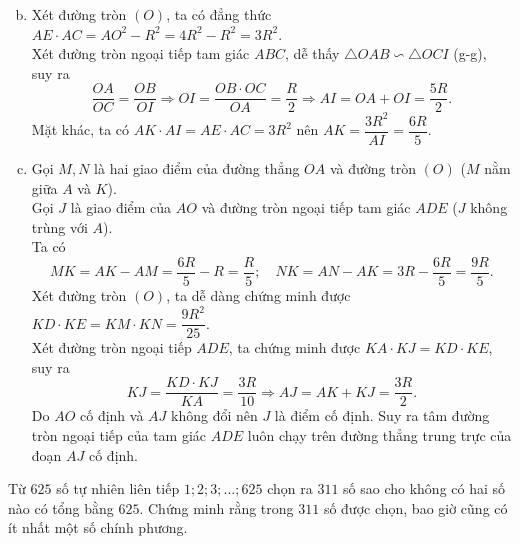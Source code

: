 \begin{ex}
{{\begin{tikzpicture}[>=stealth]
	\end{tikzpicture}
}
	\begin{enumerate}[a)]
	\setcounter{enumi}{1}
	\item Xét đường tròn $(O)$, ta có đẳng thức $AE \cdot AC = AO^2 - R^2 = 4R^2 - R^2 = 3R^2$.	\\
	Xét đường tròn ngoại tiếp tam giác $ABC$, dễ thấy $\triangle OAB \backsim \triangle OCI$ (g-g), suy ra $$\dfrac{OA}{OC} = \dfrac{OB}{OI} \Rightarrow OI = \dfrac{OB \cdot OC}{OA} = \dfrac{R}{2} \Rightarrow AI = OA + OI = \dfrac{5R}{2}.$$
	Mặt khác, ta có $AK \cdot AI = AE \cdot AC = 3R^2$ nên $AK = \dfrac{3R^2}{AI} = \dfrac{6R}{5}$.
	\item Gọi $M,N$ là hai giao điểm của đường thẳng $OA$ và đường tròn $(O)$ ($M$ nằm giữa $A$ và $K$).\\
	Gọi $J$ là giao điểm của $AO$ và đường tròn ngoại tiếp tam giác $ADE$ ($J$ không trùng với $A$).\\
	Ta có 
	$$MK = AK - AM = \dfrac{6R}{5} - R = \dfrac{R}{5}; \quad NK = AN - AK = 3R - \dfrac{6R}{5} = \dfrac{9R}{5}.$$
	Xét đường tròn $(O)$, ta dễ dàng chứng minh được $KD \cdot KE = KM \cdot KN = \dfrac{9R^2}{25}$.\\
	Xét đường tròn ngoại tiếp $ADE$, ta chứng minh được $KA \cdot KJ = KD \cdot KE$, suy ra $$KJ = \dfrac{KD \cdot KJ}{KA} = \dfrac{3R}{10} \Rightarrow AJ = AK + KJ = \dfrac{3R}{2}.$$
	Do $AO$ cố định và $AJ$ không đổi nên $J$ là điểm cố định. Suy ra tâm đường tròn ngoại tiếp của tam giác $ADE$ luôn chạy trên đường thẳng trung trực của đoạn $AJ$ cố định.
	\end{enumerate}
}
\end{ex}

\begin{ex}%
Từ $625$ số tự nhiên liên tiếp $1;2;3;\dots;625$ chọn ra $311$ số sao cho không có hai số nào có tổng bằng $625$. Chứng minh rằng trong $311$ số được chọn, bao giờ cũng có ít nhất một số chính phương.
\end{ex}

